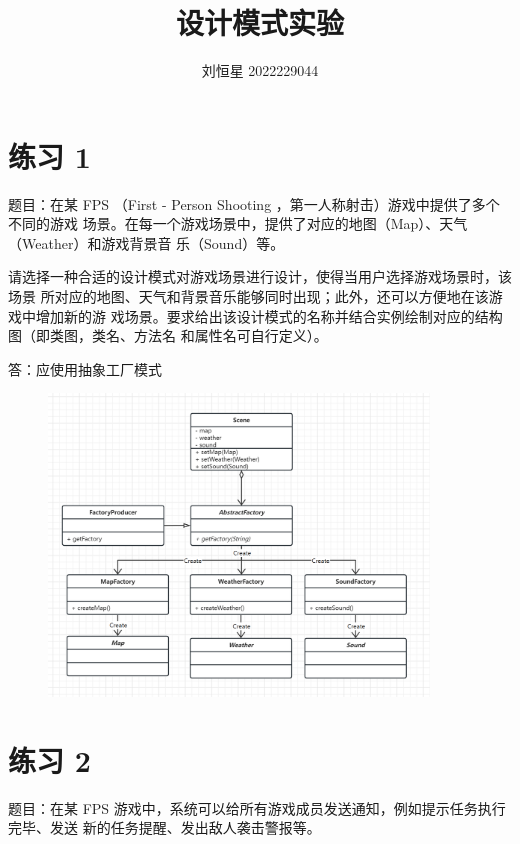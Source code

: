 \documentclass{article}
\title{设计模式实验}
\author{刘恒星 2022229044}
\begin{document}
\maketitle

\section*{练习 1}

题目：在某 FPS （First - Person Shooting ，第一人称射击）游戏中提供了多个不同的游戏
场景。在每一个游戏场景中，提供了对应的地图（Map）、天气（Weather）和游戏背景音
乐（Sound）等。

请选择一种合适的设计模式对游戏场景进行设计，使得当用户选择游戏场景时，该场景
所对应的地图、天气和背景音乐能够同时出现；此外，还可以方便地在该游戏中增加新的游
戏场景。要求给出该设计模式的名称并结合实例绘制对应的结构图（即类图，类名、方法名
和属性名可自行定义）。


\vspace{1em}

答：应使用抽象工厂模式

\begin{figure}[H]
    \centering
    \includegraphics[width=0.9\textwidth]{UML1.png}
\end{figure} 



\section*{练习 2}

题目：在某 FPS 游戏中，系统可以给所有游戏成员发送通知，例如提示任务执行完毕、发送
新的任务提醒、发出敌人袭击警报等。
\end{document}
